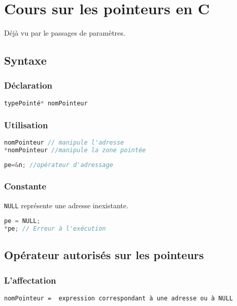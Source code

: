 \chapter{Cours sur les pointeurs en C}\label{pointeurs}
Déjà vu par le passages de paramètres.
\section{Syntaxe}
	\subsection{Déclaration}
\begin{lstlisting}[language=C, numbers=none,frame=none, caption=Syntaxe de déclaration d'un pointeur]
typePointé* nomPointeur
\end{lstlisting}

	\subsection{Utilisation}
\begin{lstlisting}[language=C, numbers=none,frame=none, caption=Syntaxe utilisation d'un pointeur]
nomPointeur // manipule l'adresse
*nomPointeur //manipule la zone pointée
\end{lstlisting}
\begin{lstlisting}[language=C, numbers=none,frame=none, caption=Exemple d'utilisation d'un pointeur]
pe=&n; //opérateur d'adressage
\end{lstlisting}

\subsection{Constante}
	\texttt{NULL} représente une adresse inexistante.
	\begin{lstlisting}[language=C, numbers=none,frame=none, caption=Exemple d'utilisation de la constante \texttt{NULL}]
pe = NULL;
*pe; // Erreur à l'exécution
	\end{lstlisting}

\section{Opérateur autorisés sur les pointeurs}
\subsection{L'affectation}
\begin{verbatim}
nomPointeur =  expression correspondant à une adresse ou à NULL
\end{verbatim}

